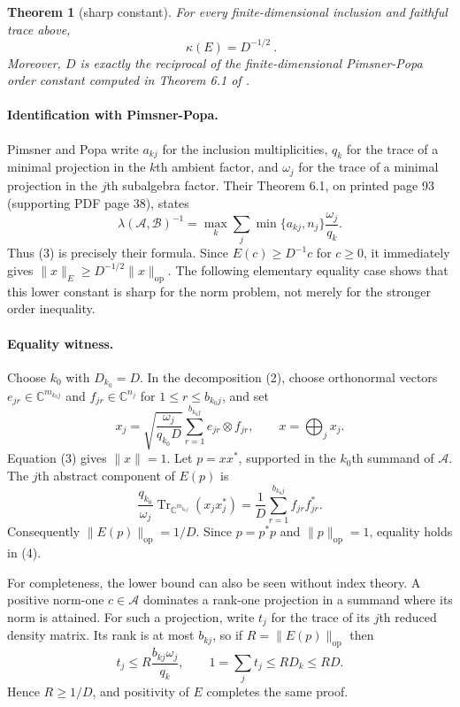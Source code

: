 \documentclass[10pt]{article}
\newtheorem{theorem}{Theorem}
\newcommand{\A}{\mathcal A}
\newcommand{\B}{\mathcal B}
\newcommand{\C}{\mathbb C}
\newcommand{\op}{\mathrm{op}}
\newcommand{\Tr}{\operatorname{Tr}}
\begin{document}
\begin{theorem}[sharp constant]
For every finite-dimensional inclusion and faithful trace above,
\[
                         \boxed{\ \kappa(E)=D^{-1/2}\ }.       \tag{4}
\]
Moreover, $D$ is exactly the reciprocal of the finite-dimensional
Pimsner-Popa order constant computed in Theorem 6.1 of \cite{PP}.
\end{theorem}

\paragraph{Identification with Pimsner-Popa.}
Pimsner and Popa write $a_{kj}$ for the inclusion multiplicities, $q_k$ for
the trace of a minimal projection in the $k$th ambient factor, and $\omega_j$
for the trace of a minimal projection in the $j$th subalgebra factor. Their
Theorem 6.1, on printed page 93 (supporting PDF page 38), states
\[
 \lambda(\A,\B)^{-1}
 =\max_k\sum_j\min\{a_{kj},n_j\}\frac{\omega_j}{q_k}.          \tag{5}
\]
Thus (3) is precisely their formula.  Since
$E(c)\ge D^{-1}c$ for $c\ge0$, it immediately gives
$\|x\|_E\ge D^{-1/2}\|x\|_{\op}$.  The following elementary equality case
shows that this lower constant is sharp for the norm problem, not merely for
the stronger order inequality.

\paragraph{Equality witness.}
Choose $k_0$ with $D_{k_0}=D$.  In the decomposition (2), choose orthonormal
vectors $e_{jr}\in\C^{m_{k_0j}}$ and $f_{jr}\in\C^{n_j}$ for
$1\le r\le b_{k_0j}$, and set
\[
 x_j=\sqrt{\frac{\omega_j}{q_{k_0}D}}
       \sum_{r=1}^{b_{k_0j}} e_{jr}\otimes f_{jr},
 \qquad x=\bigoplus_jx_j.
\]
Equation (3) gives $\|x\|=1$.  Let $p=xx^*$, supported in the $k_0$th
summand of $\A$.  The $j$th abstract component of $E(p)$ is
\[
 \frac{q_{k_0}}{\omega_j}
 \Tr_{\C^{m_{k_0j}}}(x_jx_j^*)
 =\frac1D\sum_{r=1}^{b_{k_0j}}f_{jr}f_{jr}^*.
\]
Consequently $\|E(p)\|_{\op}=1/D$.  Since $p=p^*p$ and
$\|p\|_{\op}=1$, equality holds in (4).

For completeness, the lower bound can also be seen without index theory.  A
positive norm-one $c\in\A$ dominates a rank-one projection in a summand where
its norm is attained.  For such a projection, write $t_j$ for the trace of its
$j$th reduced density matrix.  Its rank is at most $b_{kj}$, so if
$R=\|E(p)\|_{\op}$ then
\[
 t_j\le R\frac{b_{kj}\omega_j}{q_k},\qquad
 1=\sum_jt_j\le RD_k\le RD.
\]
Hence $R\ge1/D$, and positivity of $E$ completes the same proof.
\end{document}
